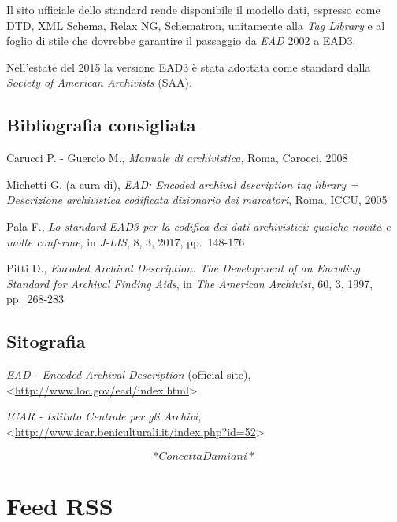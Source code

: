 \documentclass[
  b5paper,
  twoside,
  11pt,
  chapterprefix=false,
  bibliography=totocnumbered,
  parskip=0]{scrbook}
\begin{document}
Il sito ufficiale dello standard rende disponibile il modello dati,
espresso come DTD, XML Schema, Relax NG, Schematron, unitamente alla
\emph{Tag Library} e al foglio di stile che dovrebbe garantire il passaggio
da \emph{EAD} 2002 a EAD3.

Nell'estate del 2015 la versione EAD3 è stata adottata come standard
dalla \emph{Society of American Archivists} (SAA).

\hypertarget{bibliografia-consigliata-9}{%
\section*{Bibliografia consigliata}\label{bibliografia-consigliata-9}}

Carucci P. - Guercio M., \emph{Manuale di archivistica}, Roma, Carocci, 2008

Michetti G. (a cura di), \emph{EAD: Encoded archival description tag library
= Descrizione archivistica codificata dizionario dei marcatori}, Roma,
ICCU, 2005

Pala F., \emph{Lo standard EAD3 per la codifica dei dati archivistici:
qualche novità e molte conferme}, in \emph{J-LIS}, 8, 3, 2017, pp.~148-176

Pitti D., \emph{Encoded Archival Description: The Development of an Encoding
Standard for Archival Finding Aids}, in \emph{The American Archivist}, 60, 3,
1997, pp.~268-283

\hypertarget{sitografia-10}{%
\section*{Sitografia}\label{sitografia-10}}

\emph{EAD - Encoded Archival Description} (official site),
\textless{}\href{http://www.loc.gov/ead/index.html}{{http://www.loc.gov/ead/index.html}}\textgreater{}

\emph{ICAR - Istituto Centrale per gli Archivi},
\textless{}\href{http://www.icar.beniculturali.it/index.php?id=52}{{http://www.icar.beniculturali.it/index.php?id=52}}\textgreater{}

\[*Concetta Damiani*\]

\hypertarget{feed-rss}{%
\chapter{Feed RSS}\label{feed-rss}}
\end{document}
